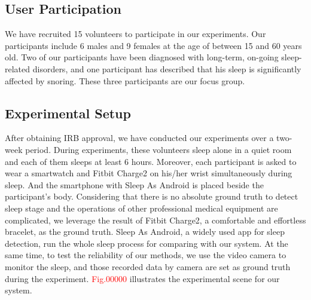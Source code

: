\subsection{User Participation} We have recruited 15 volunteers to participate in our experiments. Our
participants include 6 males and 9 females at the age of between 15 and 60 years old. Two of our participants have been diagnosed with
long-term, on-going sleep-related disorders, and one participant has described that his sleep is significantly affected by snoring. These
three participants are our focus group.

\subsection{Experimental Setup}
After obtaining IRB approval, we have conducted our experiments over a two-week period. During experiments, these volunteers sleep alone in
a quiet room and each of them sleeps at least 6 hours. Moreover, each participant is asked to wear a smartwatch and Fitbit Charge2
\cite{fitbit} on his/her wrist simultaneously during sleep. And the smartphone with Sleep As Android \cite{SleepAndroid} is placed beside
the participant's body. Considering that there is no absolute ground truth to detect sleep stage and the operations of other professional
medical equipment are complicated, we leverage the result of Fitbit Charge2, a comfortable and effortless bracelet, as the ground truth.
Sleep As Android, a widely used app for sleep detection, run the whole sleep process for comparing with our system. At the same time, to
test the reliability of our methods, we use the video camera to monitor the sleep, and those recorded data by camera are set as ground
truth during the experiment. \textcolor{red}{Fig.00000} illustrates the experimental scene for our system.

